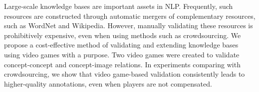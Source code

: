 Large-scale knowledge bases are important assets in NLP. Frequently, such resources are constructed through automatic mergers of complementary resources, such as WordNet and Wikipedia. However, manually validating these resources is prohibitively expensive, even when using methods such as crowdsourcing. We propose a cost-effective method of validating and extending knowledge bases using video games with a purpose. Two video games were created to validate concept-concept and concept-image relations. In experiments comparing with crowdsourcing, we show that video game-based validation consistently leads to higher-quality annotations, even when players are not compensated.

